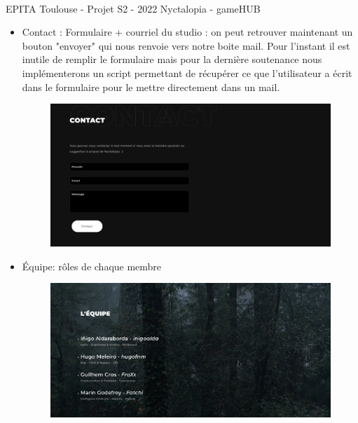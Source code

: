 \vfill
\noindent\makebox[\linewidth]{\rule{.8\paperwidth}{.6pt}}\\[0.2cm]
EPITA Toulouse - Projet S2 - 2022 \hfill Nyctalopia - gameHUB
\noindent\makebox[\linewidth]{\rule{.8\paperwidth}{.6pt}}
\newpage

\begin{itemize}

    \item Contact : Formulaire + courriel du studio : on peut retrouver maintenant un bouton "envoyer" qui nous renvoie vers notre boite mail. Pour l'instant il est inutile de remplir le formulaire mais pour la dernière soutenance nous implémenterons un script permettant de récupérer ce que l'utilisateur a écrit dans le formulaire pour le mettre directement dans un mail.
    
\begin{figure}[H]
\centering
\begin{minipage}{.5\textwidth}
  \centering
  \centerline{\includegraphics[width=1\linewidth]{img/Contact.png}}
  \label{fig:contact}
\end{minipage}%
\end{figure}


    \item Équipe: rôles de chaque membre 

\begin{figure}[H]
\centering
\begin{minipage}{.5\textwidth}
  \centering
  \centerline{\includegraphics[width=1\linewidth]{img/team.PNG}}
  \label{fig:team}
\end{minipage}%
\end{figure}
    


\end{itemize}
